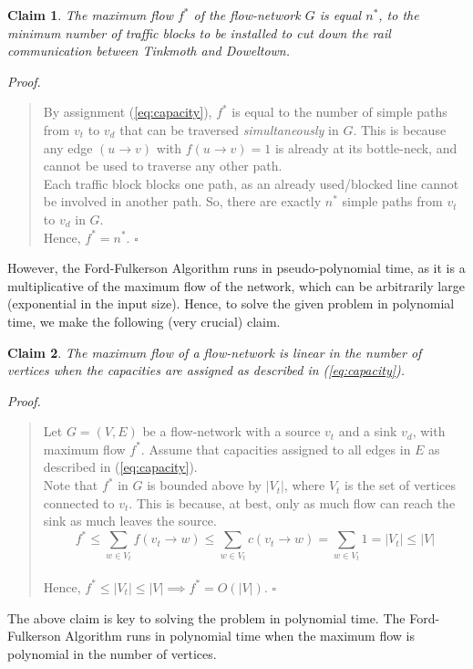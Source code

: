 \documentclass[12pt]{report}
\newtheorem{claim}{Claim}
\begin{document}
    \begin{claim}
        \label{claim:max-flow-min-cut}
        The maximum flow $f^{*}$ of the flow-network $G$ is equal $n^{*}$, to the minimum number of traffic blocks to be installed to cut down the
        rail communication between Tinkmoth and Doweltown.
    \end{claim}
    \textit{Proof.}
    \begin{quote}
        By assignment (\ref{eq:capacity}), $f^{*}$ is equal to the number of simple paths from $v_{t}$ to $v_{d}$ that can be traversed \textit{simultaneously} in $G$.
        This is because any edge $(u \to v)$ with $f(u \to v) = 1$ is already at its bottle-neck, and cannot be used to traverse any other path. \\
        Each traffic block blocks one path, as an already used/blocked line cannot be involved in another path. So, there are exactly $n^{*}$ simple
        paths from $v_{t}$ to $v_{d}$ in $G$. \\
        Hence, $f^{*} = n^{*}$. \hfill $\square$
    \end{quote}
    \vspace*{10pt}
    However, the Ford-Fulkerson Algorithm runs in pseudo-polynomial time, as it is a multiplicative of the maximum flow of the network,
    which can be arbitrarily large (exponential in the input size).
    Hence, to solve the given problem in polynomial time, we make the following (very crucial) claim.
    \vspace*{10pt}

    \begin{claim}
        \label{claim:polynomial}
        The maximum flow of a flow-network is linear in the number of vertices when
        the capacities are assigned as described in (\ref{eq:capacity}).
    \end{claim}
    \textit{Proof.}
    \begin{quote}
        Let $G = (V, E)$ be a flow-network with a source $v_{t}$ and a sink $v_{d}$, with maximum flow $f^{*}$.
        Assume that capacities assigned to all edges in $E$ as described in (\ref{eq:capacity}).
        \vspace*{10pt} \\
        Note that $f^{*}$ in $G$ is bounded above by $|V_{t}|$, where $V_{t}$ is the set of vertices connected to $v_{t}$.
        This is because, at best, only as much flow can reach the sink as much leaves the source.
        \begin{equation}
            f^{*} \leq \sum_{w \in V_{t}} f(v_{t} \to w) \leq \sum_{w \in V_{t}} c(v_{t} \to w) = \sum_{w \in V_{t}} 1 = |V_{t}| \leq |V|
        \end{equation}
        \vspace*{10pt} \\
        Hence, $f^{*} \leq |V_{t}| \leq |V| \implies f^{*} = O(|V|)$. \hfill $\square$
    \end{quote}
    \vspace*{10pt}
    The above claim is key to solving the problem in polynomial time.
    The Ford-Fulkerson Algorithm runs in polynomial time when the maximum flow is polynomial in the number of vertices.
\end{document}
